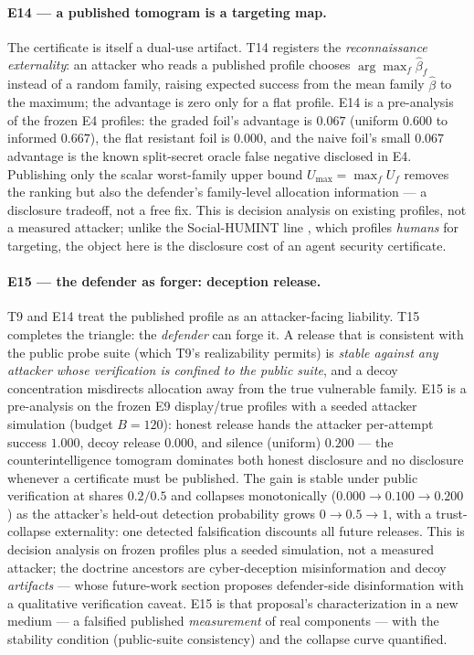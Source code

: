 \documentclass[10pt,twocolumn]{article}
\begin{document}
\paragraph{E14 --- a published tomogram is a targeting map.}
The certificate is itself a dual-use artifact. T14 registers the
\emph{reconnaissance externality}: an attacker who reads a published profile
chooses $\arg\max_f\hat\beta_f$ instead of a random family, raising expected
success from the mean family $\hat\beta$ to the maximum; the advantage is zero
only for a flat profile. E14 is a pre-analysis of the frozen E4 profiles: the
graded foil's advantage is $0.067$ (uniform $0.600$ to informed $0.667$), the
flat resistant foil is $0.000$, and the naive foil's small $0.067$ advantage is
the known split-secret oracle false negative disclosed in E4. Publishing only
the scalar worst-family upper bound $U_{\max}=\max_f U_f$ removes the ranking
but also the defender's family-level allocation information --- a disclosure
tradeoff, not a free fix. This is decision analysis on existing profiles, not a
measured attacker; unlike the Social-HUMINT line \cite{socialhumint2026}, which
profiles \emph{humans} for targeting, the object here is the disclosure cost of
an agent security certificate.

\paragraph{E15 --- the defender as forger: deception release.}
T9 and E14 treat the published profile as an attacker-facing liability. T15
completes the triangle: the \emph{defender} can forge it. A release that is
consistent with the public probe suite (which T9's realizability permits) is
\emph{stable against any attacker whose verification is confined to the public
suite}, and a decoy concentration misdirects allocation away from the true
vulnerable family. E15 is a pre-analysis on the frozen E9 display/true
profiles with a seeded attacker simulation (budget $B=120$): honest release
hands the attacker per-attempt success $1.000$, decoy release $0.000$, and
silence (uniform) $0.200$ --- the counterintelligence tomogram dominates both
honest disclosure and no disclosure whenever a certificate must be published.
The gain is stable under public verification at shares $0.2/0.5$ and collapses
monotonically ($0.000\to0.100\to0.200$) as the attacker's held-out detection
probability grows $0\to0.5\to1$, with a trust-collapse externality: one
detected falsification discounts all future releases. This is decision
analysis on frozen profiles plus a seeded simulation, not a measured attacker;
the doctrine ancestors are cyber-deception misinformation
\cite{fergusonwalter2017,bodeau2013,perry2025} and decoy \emph{artifacts}
\cite{honeypotagents2026} --- whose future-work section proposes defender-side
disinformation with a qualitative verification caveat. E15 is that proposal's
characterization in a new medium --- a falsified published \emph{measurement}
of real components --- with the stability condition (public-suite consistency)
and the collapse curve quantified.
\end{document}
